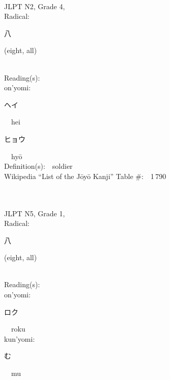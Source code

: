 \begin{multicols}{2}
{\fontsize{34pt}{40pt}  }\ \ \\  %
{JLPT N2, Grade 4, \\Radical:\ \ {\begin{CJK}{UTF8}{min} 八 \end{CJK}} (eight, all) } \\
Reading(s):\ \ \\
{\hspace*{1em}}on'yomi:\ \ \\
{\hspace*{2em}}{\begin{CJK}{UTF8}{min} ヘイ \end{CJK}}\ \ hei\ \ \\
{\hspace*{2em}}{\begin{CJK}{UTF8}{min} ヒョウ \end{CJK}}\ \ hy\=o\ \ \\
Definition(s):\ \ soldier \\
Wikipedia ``List of the J\=oy\=o Kanji'' Table \#:\ \ 1\,790 \\
\ \ \\
{\fontsize{34pt}{40pt}  }\ \ \\  %
{JLPT N5, Grade 1, \\Radical:\ \ {\begin{CJK}{UTF8}{min} 八 \end{CJK}} (eight, all) } \\
Reading(s):\ \ \\
{\hspace*{1em}}on'yomi:\ \ \\
{\hspace*{2em}}{\begin{CJK}{UTF8}{min} ロク \end{CJK}}\ \ roku\ \ \\
{\hspace*{1em}}kun'yomi:\ \ \\
{\hspace*{2em}}{\begin{CJK}{UTF8}{min} む \end{CJK}}\ \ mu\ \ \\

\end{multicols}
